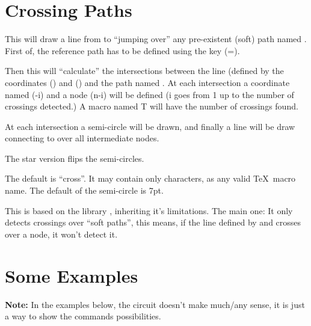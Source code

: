\documentclass[10pt]{article}
\begin{document}
\section{Crossing Paths}\label{pathcross}

\begin{codedescribe}{\pathcross}
\begin{codesyntax}%
\tsobj{\pathcross*}
\end{codesyntax}
This will draw a line from  to  ``jumping over'' any pre-existent (soft) path named .
First of, the reference path  has to be defined using the  key (=).

Then this will ``calculate'' the intersections between the line (defined by the coordinates () and () and the path named . At each intersection a coordinate named (-i) and a node (n-i) will be defined (i goes from 1 up to the number of crossings detected.) A macro named T will have the number of crossings found. 

At each intersection a semi-circle will be drawn, and finally a line will be draw connecting  to  over all intermediate nodes.

The  star version flips the semi-circles.
\begin{tsremark}
  The default  is ``cross''. It may contain only characters, as any valid \TeX\ macro name. The default  of the semi-circle is 7pt.
\end{tsremark}
\begin{tsremark}
  This is based on the  library , inheriting it's limitations. The main one: It only detects crossings over ``soft paths'', this means, if the line defined by  and  crosses over a node, it won't detect it.
\end{tsremark}
\end{codedescribe}

\newpage
\section{Some Examples}
\textbf{\color{red}Note:} In the examples below, the circuit doesn't make much/any sense, it is just a way to show the commands possibilities.
\end{document}
